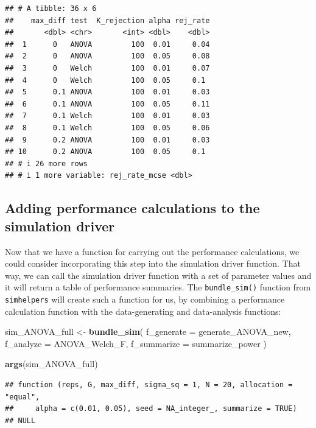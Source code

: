 \documentclass[
]{book}
\newenvironment{Shaded}{\begin{snugshade}}{\end{snugshade}}
\newcommand{\AttributeTok}[1]{\textcolor[rgb]{0.13,0.29,0.53}{#1}}
\newcommand{\FunctionTok}[1]{\textcolor[rgb]{0.13,0.29,0.53}{\textbf{#1}}}
\newcommand{\NormalTok}[1]{#1}
\newcommand{\OtherTok}[1]{\textcolor[rgb]{0.56,0.35,0.01}{#1}}
\begin{document}
\begin{verbatim}
## # A tibble: 36 x 6
##    max_diff test  K_rejection alpha rej_rate
##       <dbl> <chr>       <int> <dbl>    <dbl>
##  1      0   ANOVA         100  0.01     0.04
##  2      0   ANOVA         100  0.05     0.08
##  3      0   Welch         100  0.01     0.07
##  4      0   Welch         100  0.05     0.1 
##  5      0.1 ANOVA         100  0.01     0.03
##  6      0.1 ANOVA         100  0.05     0.11
##  7      0.1 Welch         100  0.01     0.03
##  8      0.1 Welch         100  0.05     0.06
##  9      0.2 ANOVA         100  0.01     0.03
## 10      0.2 ANOVA         100  0.05     0.1 
## # i 26 more rows
## # i 1 more variable: rej_rate_mcse <dbl>
\end{verbatim}

\subsection{Adding performance calculations to the simulation driver}\label{adding-performance-calculations-to-the-simulation-driver}

Now that we have a function for carrying out the performance calculations, we could consider incorporating this step into the simulation driver function.
That way, we can call the simulation driver function with a set of parameter values and it will return a table of performance summaries.
The \texttt{bundle\_sim()} function from \texttt{simhelpers} will create such a function for us, by combining a performance calculation function with the data-generating and data-analysis functions:

\begin{Shaded}
\begin{Highlighting}[]
\NormalTok{sim\_ANOVA\_full }\OtherTok{\textless{}{-}} \FunctionTok{bundle\_sim}\NormalTok{(}
  \AttributeTok{f\_generate =}\NormalTok{ generate\_ANOVA\_new, }
  \AttributeTok{f\_analyze =}\NormalTok{ ANOVA\_Welch\_F,}
  \AttributeTok{f\_summarize =}\NormalTok{ summarize\_power}
\NormalTok{)}

\FunctionTok{args}\NormalTok{(sim\_ANOVA\_full)}
\end{Highlighting}
\end{Shaded}

\begin{verbatim}
## function (reps, G, max_diff, sigma_sq = 1, N = 20, allocation = "equal", 
##     alpha = c(0.01, 0.05), seed = NA_integer_, summarize = TRUE) 
## NULL
\end{verbatim}
\end{document}
